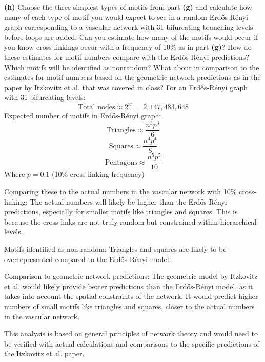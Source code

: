 \documentclass{article}
\begin{document}
\textbf{(h)} Choose the three simplest types of motifs from part \textbf{(g)} and calculate how many of each type of motif you would expect to see in a random Erdős-Rényi graph corresponding to a vascular network with 31 bifurcating branching levels before loops are added. Can you estimate how many of the motifs would occur if you know cross-linkings occur with a frequency of 10\% as in part \textbf{(g)}? How do these estimates for motif numbers compare with the Erdős-Rényi predictions? Which motifs will be identified as nonrandom? What about in comparison to the estimates for motif numbers based on the geometric network predictions as in the paper by Itzkovitz et al. that was covered in class?
For an Erdős-Rényi graph with 31 bifurcating levels:
\[
\text{Total nodes} \approx 2^{31} = 2,147,483,648
\]
Expected number of motifs in Erdős-Rényi graph:
\[
\text{Triangles} \approx \frac{n^3p^3}{6}
\]
\[
\text{Squares} \approx \frac{n^4p^4}{8}
\]
\[
\text{Pentagons} \approx \frac{n^5p^5}{10}
\]
Where \( p = 0.1 \) (10\% cross-linking frequency)

Comparing these to the actual numbers in the vascular network with 10\% cross-linking:
The actual numbers will likely be higher than the Erdős-Rényi predictions, especially for smaller motifs like triangles and squares. This is because the cross-links are not truly random but constrained within hierarchical levels.

Motifs identified as non-random:
Triangles and squares are likely to be overrepresented compared to the Erdős-Rényi model.

Comparison to geometric network predictions:
The geometric model by Itzkovitz et al. would likely provide better predictions than the Erdős-Rényi model, as it takes into account the spatial constraints of the network. It would predict higher numbers of small motifs like triangles and squares, closer to the actual numbers in the vascular network.

This analysis is based on general principles of network theory and would need to be verified with actual calculations and comparisons to the specific predictions of the Itzkovitz et al. paper.
\end{document}
